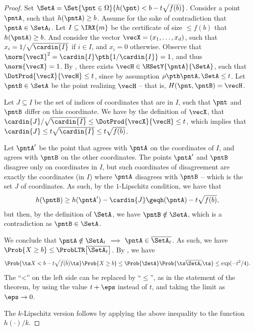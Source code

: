 \begin{proof}
    Set
    $\SetA = \Set{\pnt \in \Omega}{ h(\pnt) < b- t\smash{\sqrt{f(b)}}
       \bigr.}$. Consider a point $\pntA$, such that
    $h(\pntA) \geq b$. Assume for the sake of contradiction that
    $\pntA \in \SetA_t$. Let $I\subseteq \IRX{m}$ be the certificate
    of size $\leq f(b)$ that $h(\pntA) \geq b$. And consider the
    vector $\vecX=(x_1,\ldots, x_d)$, such that
    $x_i = 1/\sqrt{\cardin{I}}$ if $i \in I$, and $x_i =0 $
    otherwise. Observe that
    $\norm{\vecX}^2 = \cardin{I}\pth{ 1/\cardin{I}} = 1$, and thus
    $\norm{\vecX} = 1$. By , there exists
    $\vecH \in \HSetY{\pntA}{\SetA}$, such that
    $\DotProd{\vecX}{\vecH}\leq t$, since by assumption
    $\distTY{\pntA}{\SetA} \leq t$. Let $\pntB \in \SetA$ be the point
    realizing $\vecH$ -- that is, $H(\pnt,\pntB) = \vecH$.

    Let $J \subseteq I$ be the set of indices of coordinates that are
    in $I$, such that $\pnt$ and $\pntB$ differ on this coordinate. We
    have by the definition of $\vecX$, that
    $\cardin{J} /\sqrt{\cardin{I}} \leq \DotProd{\vecX}{\vecH}\leq t$,
    which implies that
    $\cardin{J} \leq t \sqrt{\cardin{I}} \leq t \sqrt{f(b)}$.

    Let $\pntA'$ be the point that agrees with $\pntA$ on the
    coordinates of $I$, and agrees with $\pntB$ on the other
    coordinates. The points $\pntA'$ and $\pntB$ disagree only on
    coordinates in $I$, but such coordinates of disagreement are
    exactly the coordinates (in $I$) where $\pntA$ disagrees with
    $\pntB$ -- which is the set $J$ of coordinates. As such, by the
    $1$-Lipschitz condition, we have that 
    \begin{equation*}
        h(\pntB) %
        \geq %
        h(\pntA') - \cardin{J}
        \geq%
        h(\pntA) - t \sqrt{f(b)},
    \end{equation*}
    but then, by the definition of $\SetA$, we have
    $\pntB \notin \SetA$, which is a contradiction as
    $\pntB \in \SetA$. 

    We conclude that $\pntA \notin \SetA_t$ $\implies$
    $\pntA \in \overline{\SetA_t}$. As such, we have
    $\Prob{X \geq b} \leq \ProbLTR \bigl[ \overline{\SetA_t}
    \bigr]$. By ,
    we have
    \begin{equation*}
        \Prob{\bigl.\ts X < b - t\smash{\sqrt{f(b)} } \ts }
        \Prob{X \geq b} %
        \leq%
        \Prob{\SetA}\Prob{ \ts \smash{\overline{\SetA_t}}\ts }%
        \leq %
        \exp( -t^2 /4).
    \end{equation*}%
    The ``<'' on the left side can be replaced by ``$\leq$'', as in
    the statement of the theorem, by using the value $t+\eps$ instead
    of $t$, and taking the limit as $\eps \rightarrow 0$. %

    The $k$-Lipschitz version follows by applying the above inequality
    to the function $h(\cdot) /k$.
\end{proof}



